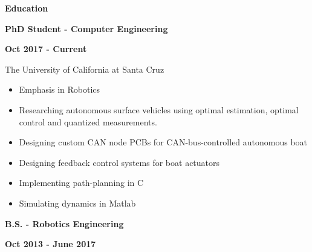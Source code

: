 \documentclass[paper=a4,fontsize=11pt]{article} %
\def \sectionSpace      {0.7cm}     %
\def \subSectionSpace   {0.3cm}     %
\def \leftColSpace      {0.12}      %
\def \middleColSpace    {0.675}     %
\def \bigMiddleColSpace {0.875}     %
\def \rightColSpace     {0.25}      %
\begin{document}
\vspace{\sectionSpace}
\noindent
\begin{minipage}[t]{\leftColSpace\linewidth}
    \noindent \textbf{Education}
\end{minipage}
\begin{minipage}[t]{\middleColSpace\linewidth}
    \noindent \textbf{PhD Student - Computer Engineering}
\end{minipage}
\begin{minipage}[t]{\rightColSpace\linewidth}
    \noindent \textbf{Oct 2017 - Current}
\end{minipage}
\begin{minipage}[t]{\leftColSpace\linewidth}
    \hfill
\end{minipage}
\begin{minipage}[t]{\bigMiddleColSpace\linewidth}
    \noindent The University of California at Santa Cruz
    \begin{itemize}[noitemsep,topsep=0pt]
        \item Emphasis in Robotics
        \item Researching autonomous surface vehicles using optimal estimation, optimal control and quantized measurements.
        \item Designing custom CAN node PCBs for CAN-bus-controlled autonomous boat
        \item Designing feedback control systems for boat actuators
        \item Implementing path-planning in C
        \item Simulating dynamics in Matlab
    \end{itemize}
\end{minipage}

\noindent
\begin{minipage}[t]{\leftColSpace\linewidth}
    \hfill
\end{minipage}
\begin{minipage}[t]{\middleColSpace\linewidth}
    \vspace{\subSectionSpace}
    \noindent \textbf{B.S. - Robotics Engineering}
\end{minipage}
\begin{minipage}[t]{\rightColSpace\linewidth}
    \vspace{\subSectionSpace}
    \noindent \textbf{Oct 2013 - June 2017}
\end{minipage}
\end{document}
